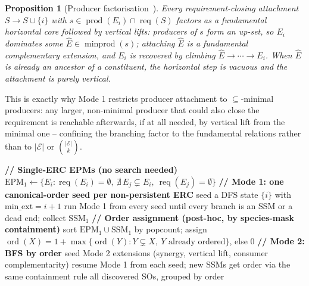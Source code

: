 \documentclass[11pt]{article}
\theoremstyle{plain}
\newtheorem{proposition}{Proposition}
\theoremstyle{remark}
\newcommand{\prods}{\operatorname{prod}}
\newcommand{\req}{\operatorname{req}}
\newcommand{\minprod}{\operatorname{minprod}}
\newcommand{\E}{\mathcal{E}}
\newcommand{\ord}{\operatorname{ord}}
\begin{document}
\begin{proposition}[Producer factorisation~\cite{BMBcompanion}]
Every requirement-closing attachment $S\to S\cup\{i\}$ with
$s\in\prods(E_i)\cap\req(S)$ factors as a fundamental horizontal core
followed by vertical lifts: producers of $s$ form an up-set, so $E_i$
dominates some $\hat E\in\minprod(s)$; attaching $\hat E$ is a fundamental
complementary extension, and $E_i$ is recovered by climbing
$\hat E\to\cdots\to E_i$. When $\hat E$ is already an ancestor of a
constituent, the horizontal step is vacuous and the attachment is purely
vertical.
\end{proposition}

This is exactly why Mode 1 restricts producer attachment to $\subseteq$-minimal
producers: any larger, non-minimal producer that could also close the
requirement is reachable afterwards, if at all needed, by vertical lift
from the minimal one -- confining the branching factor to the fundamental
relations rather than to $|\E|$ or $\binom{|\E|}{k}$.

\begin{algorithm}[t]
\caption{ComputeAllPersistentModules($\E$, hier, $\mathcal{F}_{\mathrm{syn}}$, $\mathcal{F}_{\mathrm{comp}}$)}
\label{alg:main}
\begin{algorithmic}[1]
\State \textbf{// Single-ERC EPMs (no search needed)}
\State $\mathrm{EPM}_1 \leftarrow \{E_i : \req(E_i)=\emptyset,\ \nexists\,E_j\subsetneq E_i,\ \req(E_j)=\emptyset\}$
\State \textbf{// Mode 1: one canonical-order seed per non-persistent ERC}
  \State seed a DFS state $\{i\}$ with $\mathrm{min\_ext}=i{+}1$
\EndFor
\State run Mode 1 from every seed until every branch is an SSM or a dead end; collect $\mathrm{SSM}_1$
\State \textbf{// Order assignment (post-hoc, by species-mask containment)}
\State sort $\mathrm{EPM}_1\cup\mathrm{SSM}_1$ by popcount; assign
       $\ord(X)=1+\max\{\ord(Y): Y\subsetneq X,\ Y \text{ already ordered}\}$, else $0$
\State \textbf{// Mode 2: BFS by order}
  \For{each $X_p$ with $\ord(X_p)=k-1$}
    \State seed Mode 2 extensions (synergy, vertical lift, consumer complementarity)
    \State resume Mode 1 from each seed; new SSMs get order via the same containment rule
  \EndFor
\EndFor
\State \Return all discovered SOs, grouped by order
\end{algorithmic}
\end{algorithm}
\end{document}
